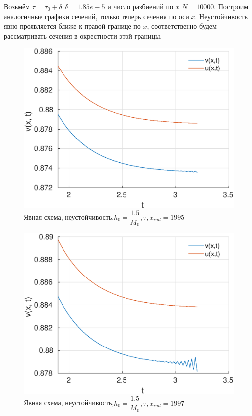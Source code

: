 \documentclass[12pt]{article}
\begin{document}
\begin{enumerate}
Возьмём $\tau = \tau_0 + \delta, \delta = 1.85e-5$ и число разбиений по $x$ $N = 10000$. Построим аналогичные графики сечений, только теперь сечения по оси $x$. Неустойчивость явно проявляется ближе к правой границе по $x$, соответственно будем рассматривать сечения в окрестности этой границы.

\begin{figure}[H]
\centerline{\includegraphics[scale = 0.7]{instable_x=1995.eps}}
\caption{Явная схема, неустойчивость,$h_0 = \dfrac{1.5}{M_0}, \tau, x_{ind} = 1995$}
\end{figure} 

\begin{figure}[H]
\centerline{\includegraphics[scale = 0.7]{instable_x=1997.eps}}
\caption{Явная схема, неустойчивость,$h_0 = \dfrac{1.5}{M_0}, \tau, x_{ind} = 1997$}
\end{figure} 


\end{enumerate}
\end{document}
